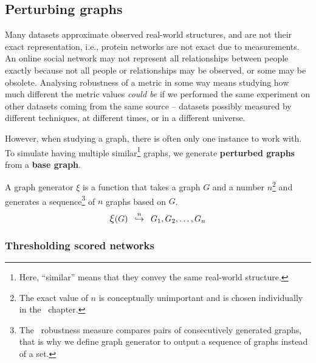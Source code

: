 


\subsection{Perturbing graphs}\label{sec:perturbing_graphs}

Many datasets approximate observed real-world structures, and are not their exact representation, i.e., protein networks are not exact due to measurements.
An online social network may not represent all relationships between people exactly because not all people or relationships may be observed, or some may be obsolete.
Analysing robustness of a metric in some way means studying how much different the metric values \textsl{could be} if we performed the same experiment on other datasets coming from the same source -- datasets possibly measured by different techniques, at different times, or in a different universe.

However, when studying a graph, there is often only one instance to work with.
To simulate having multiple similar\footnote{Here, ``similar'' means that they convey the same real-world structure.} graphs, we generate \textbf{perturbed graphs} from a \textbf{base graph}.

\begin{savenotes}
    \begin{definition}
        \vspace*{-2mm}
        A graph generator $\xi$ is a function that takes a graph $G$ and a number $n$\footnote{The exact value of $n$ is conceptually unimportant and is chosen individually in the~ chapter.} and generates a sequence\footnote{The~ robustness measure compares pairs of consecutively generated graphs, that is why we define graph generator to output a sequence of graphs instead of a set.} of $n$ graphs based on $G$.
        \begin{equation}
            \mathlarger{\xi}(G) \generates{n} G_1, G_2, \dots, G_n
        \end{equation}
    \end{definition}
\end{savenotes}

\subsubsection*{Thresholding scored networks}


